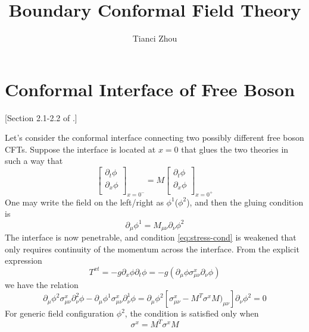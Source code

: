 \documentclass{article}
\title{Boundary Conformal Field Theory}
\author{Tianci Zhou}
\begin{document}
\maketitle
\large


\section{Conformal Interface of Free Boson}
\label{sec:var-boson}
[Section 2.1-2.2 of \cite{bachas_permeable_2002}.]

Let's consider the conformal interface connecting two possibly different free boson CFTs. Suppose the interface is located at $x = 0$ that glues the two theories in such a way that 
\begin{equation}
\begin{bmatrix}
\partial_t \phi\\
\partial_x \phi\\ 
\end{bmatrix}_{x = 0^-} 
 = M \begin{bmatrix}
\partial_t \phi\\
\partial_x \phi\\ 
\end{bmatrix}_{x = 0^+} 
\end{equation}
One may write the field on the left/right as $\phi^1$($\phi^2$), and then the gluing condition is
\begin{equation}
\partial_{\mu} \phi^1 = M_{\mu\nu} \partial_{\nu} \phi^2 
\end{equation}
The interface is now penetrable, and condition \eqref{eq:stress-cond} is weakened that only requires continuity of the momentum across the interface. From the explicit expression
\begin{equation}
T^{xt} = - g \partial_x \phi \partial_t \phi  = -g(\partial_{\mu} \phi \sigma^x_{\mu\nu}  \partial_{\nu} \phi ) 
\end{equation}
we have the relation
\begin{equation}
\partial_{\mu} \phi^2 \sigma^x_{\mu\nu}  \partial^2_{\nu} \phi -  \partial_{\mu} \phi^1 \sigma^x_{\mu\nu}  \partial^1_{\nu} \phi = 
\partial_{\mu} \phi^2 [\sigma^x_{\mu\nu} - M^T  \sigma^x M)_{\mu\nu} ]  \partial_{\nu} \phi^2 = 0
\end{equation}
For generic field configuration $\phi^2$, the condition is satisfied only when
\begin{equation}
\sigma^x = M^T \sigma^x M 
\end{equation}
\end{document}
